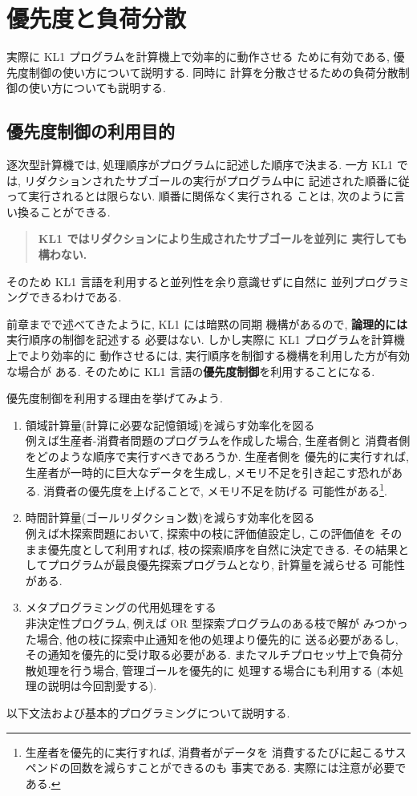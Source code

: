 \documentclass[a4,titlepage]{jsreport}
\let\dg\bf
\begin{document}
\chapter{優先度と負荷分散}
実際に KL1 プログラムを計算機上で効率的に動作させる
ために有効である, 優先度制御の使い方について説明する.  同時に
計算を分散させるための負荷分散制御の使い方についても説明する.

\section{優先度制御の利用目的}
逐次型計算機では, 処理順序がプログラムに記述した順序で決まる.  
一方 KL1 では, リダクションされたサブゴールの実行がプログラム中に
記述された順番に従って実行されるとは限らない.  順番に関係なく実行される
ことは, 次のように言い換ることができる.  
\begin{quote}
{\dg KL1 ではリダクションにより生成されたサブゴールを並列に
実行しても構わない.  }
\end{quote}
そのため KL1 言語を利用すると並列性を余り意識せずに自然に
並列プログラミングできるわけである.  

前章までで述べてきたように, KL1 には暗黙の同期
機構があるので, {\dg 論理的には}実行順序の制御を記述する
必要はない.  しかし実際に KL1 プログラムを計算機上でより効率的に
動作させるには, 実行順序を制御する機構を利用した方が有効な場合が
ある.  そのために KL1 言語の{\dg 優先度制御}を利用することになる.  

優先度制御を利用する理由を挙げてみよう.  
\begin{enumerate}
\item 領域計算量(計算に必要な記憶領域)を減らす効率化を図る\\
例えば生産者-消費者問題のプログラムを作成した場合, 生産者側と
消費者側をどのような順序で実行すべきであろうか.  生産者側を
優先的に実行すれば, 生産者が一時的に巨大なデータを生成し, 
メモリ不足を引き起こす恐れがある.  
消費者の優先度を上げることで, メモリ不足を防げる
可能性がある\footnote{生産者を優先的に実行すれば, 消費者がデータを
消費するたびに起こるサスペンドの回数を減らすことができるのも
事実である.  実際には注意が必要である.}.
\item 時間計算量(ゴールリダクション数)を減らす効率化を図る\\
例えば木探索問題において, 探索中の枝に評価値設定し, この評価値を
そのまま優先度として利用すれば, 枝の探索順序を自然に決定できる.  
その結果としてプログラムが最良優先探索プログラムとなり, 計算量を減らせる
可能性がある.  
\item メタプログラミングの代用処理をする\\
非決定性プログラム, 例えば OR 型探索プログラムのある枝で解が
みつかった場合, 他の枝に探索中止通知を他の処理より優先的に
送る必要があるし, その通知を優先的に受け取る必要がある.  
またマルチプロセッサ上で負荷分散処理を行う場合, 管理ゴールを優先的に
処理する場合にも利用する (本処理の説明は今回割愛する).  
\end{enumerate}
以下文法および基本的プログラミングについて説明する.  
\end{document}

